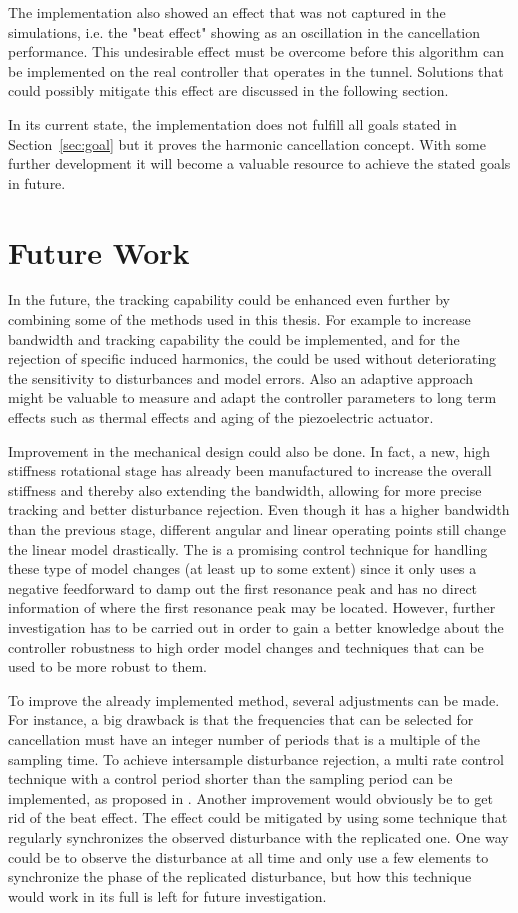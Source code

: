 The implementation also showed an effect that was not captured in the simulations, i.e. the "beat effect" showing as an oscillation in the cancellation performance. This undesirable effect must be overcome before this algorithm can be implemented on the real controller that operates in the \abbrLHC tunnel. Solutions that could possibly mitigate this effect are discussed in the following section.

In its current state, the implementation does not fulfill all goals stated in Section~\ref{sec:goal} but it proves the harmonic cancellation concept. With some further development it will become a valuable resource to achieve the stated goals in future.

\section{Future Work}
In the future, the tracking capability could be enhanced even further by combining some of the methods used in this thesis. For example to increase bandwidth and tracking capability the \abbrIRC could be implemented, and for the rejection of specific induced harmonics, the \abbrRFDC could be used without deteriorating the sensitivity to disturbances and model errors. Also an adaptive approach might be valuable to measure and adapt the controller parameters to long term effects such as thermal effects and aging of the piezoelectric actuator.

Improvement in the mechanical design could also be done. In fact, a new, high stiffness rotational stage has already been manufactured to increase the overall stiffness and thereby also extending the bandwidth, allowing for more precise tracking and better disturbance rejection. Even though it has a higher bandwidth than the previous stage, different angular and linear operating points still change the linear model drastically. The \abbrIRC is a promising control technique for handling these type of model changes (at least up to some extent) since it only uses a negative feedforward to damp out the first resonance peak and has no direct information of where the first resonance peak may be located. However, further investigation has to be carried out in order to gain a better knowledge about the controller robustness to high order model changes and techniques that can be used to be more robust to them.

To improve the already implemented \abbrRFDC method, several adjustments can be made. For instance, a big drawback is that the frequencies that can be selected for cancellation must have an integer number of periods that is a multiple of the sampling time. To achieve intersample disturbance rejection, a multi rate control technique with a control period shorter than the sampling period can be implemented, as proposed in \citep{fujimoto2009rro}. Another improvement would obviously be to get rid of the beat effect. The effect could be mitigated by using some technique that regularly synchronizes the observed disturbance with the replicated one. One way could be to observe the disturbance at all time and only use a few elements to synchronize the phase of the replicated disturbance, but how this technique would work in its full is left for future investigation.
